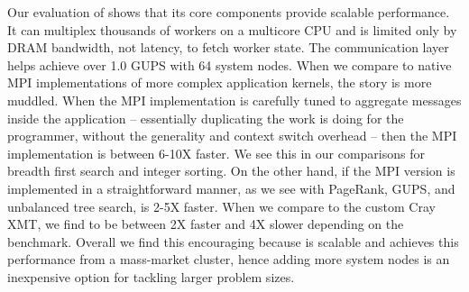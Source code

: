 Our evaluation of \Grappa shows that its core components provide scalable performance.  It can multiplex thousands of workers on a multicore CPU and is limited only by DRAM bandwidth, not latency, to fetch worker state.  The communication layer helps \Grappa achieve over 1.0 GUPS with 64 system nodes.  When we compare \Grappa to native MPI implementations of more complex application kernels, the story is more muddled.  When the MPI implementation is carefully tuned to aggregate messages inside the application -- essentially duplicating the work \Grappa is doing for the programmer, without the generality and context switch overhead -- then the MPI implementation is between 6-10X faster.  We see this in our comparisons for breadth first search and integer sorting.  On the other hand, if the MPI version is implemented in a straightforward manner, as we see with PageRank, GUPS, and unbalanced tree search, \Grappa is 2-5X faster.  When we compare \Grappa to the custom Cray XMT, we find \Grappa to be between 2X faster and 4X slower depending on the benchmark.  Overall we find this encouraging because \Grappa is scalable and achieves this performance from a mass-market cluster, hence adding more system nodes is an inexpensive option for tackling larger problem sizes.
 
